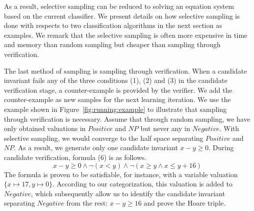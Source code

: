 As a result, selective sampling can be reduced to solving an equation system based on the current classifier. We present details on how selective sampling is done with respects to two classification algorithms in the next section as examples. We remark that the selective sampling is often more expensive in time and memory than random sampling but cheaper than sampling through verification.


The last method of sampling is sampling through verification. When a candidate invariant fails any of the three conditions (1), (2) and (3) in the candidate verification stage,
a counter-example is provided by the verifier. We add the counter-example as new samples for the next learning iteration. We use the example shown in Figure~\ref{fig:running:example} to illustrate that sampling through verification is necessary. Assume that through random sampling, we have only obtained valuations in $\mathit{Positive}$ and $\mathit{NP}$ but never any in $\mathit{Negative}$. With selective sampling, we would converge to the half space separating $\mathit{Positive}$ and $\mathit{NP}$. As a result, we generate only one candidate invariant $x - y \geq 0$. During candidate verification, formula (6) is as follows. \[
x - y \geq 0 \land \neg (x < y) \land \neg (x \geq y \land x \leq y + 16)
\]
The formula is proven to be satisfiable, for instance, with a variable valuation $\{x \mapsto 17, y \mapsto 0\}$. According to our categorization, this valuation is added to $\mathit{Negative}$, which subsequently allow us to identify the candidate invariant separating $\mathit{Negative}$ from the rest: $x - y \geq 16$ and prove the Hoare triple.

